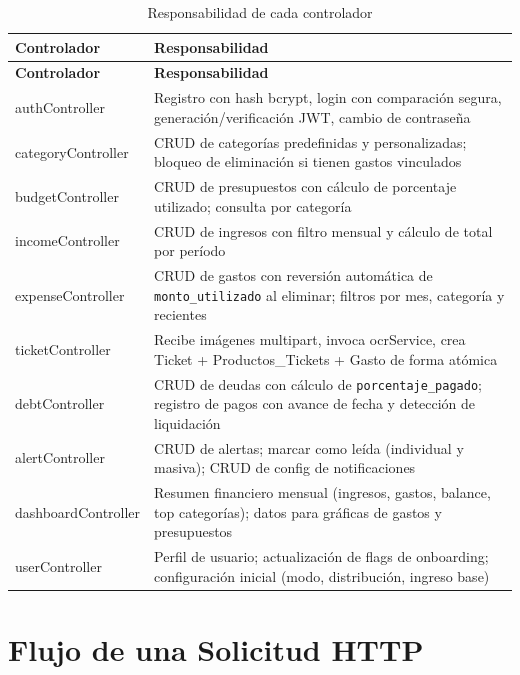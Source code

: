 \begin{longtable}{>{\ttfamily}p{4.5cm} p{9cm}}
  \caption{Responsabilidad de cada controlador}
  \label{tab:controllers} \\
  \toprule
  \textbf{Controlador} & \textbf{Responsabilidad} \\
  \midrule
  \endfirsthead
  \toprule
  \textbf{Controlador} & \textbf{Responsabilidad} \\
  \midrule
  \endhead
  authController      & Registro con hash bcrypt, login con comparación segura, generación/verificación JWT, cambio de contraseña \\
  \addlinespace
  categoryController  & CRUD de categorías predefinidas y personalizadas; bloqueo de eliminación si tienen gastos vinculados \\
  \addlinespace
  budgetController    & CRUD de presupuestos con cálculo de porcentaje utilizado; consulta por categoría \\
  \addlinespace
  incomeController    & CRUD de ingresos con filtro mensual y cálculo de total por período \\
  \addlinespace
  expenseController   & CRUD de gastos con reversión automática de \texttt{monto\_utilizado} al eliminar; filtros por mes, categoría y recientes \\
  \addlinespace
  ticketController    & Recibe imágenes multipart, invoca ocrService, crea Ticket + Productos\_Tickets + Gasto de forma atómica \\
  \addlinespace
  debtController      & CRUD de deudas con cálculo de \texttt{porcentaje\_pagado}; registro de pagos con avance de fecha y detección de liquidación \\
  \addlinespace
  alertController     & CRUD de alertas; marcar como leída (individual y masiva); CRUD de config de notificaciones \\
  \addlinespace
  dashboardController & Resumen financiero mensual (ingresos, gastos, balance, top categorías); datos para gráficas de gastos y presupuestos \\
  \addlinespace
  userController      & Perfil de usuario; actualización de flags de onboarding; configuración inicial (modo, distribución, ingreso base) \\
  \bottomrule
\end{longtable}

\section{Flujo de una Solicitud HTTP}

